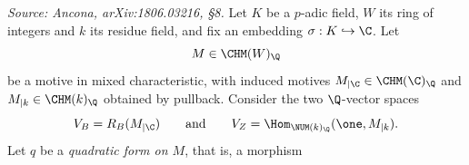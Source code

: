 \begin{theorem}
  \label{thm:mainthm}
  \textit{Source: Ancona, arXiv:1806.03216, §8.}
  Let \(K\) be a \(p\)-adic field, \(W\) its ring of integers and \(k\) its
  residue field, and fix an embedding \(\sigma : K \hookrightarrow \C\). Let
  \[M \in \CHM(W)_\Q\]
  be a motive in mixed characteristic, with induced motives
  \(M_{\vert\C} \in \CHM(\C)_\Q\) and \(M_{\vert{k}} \in \CHM(k)_\Q\) obtained by
  pullback. Consider the two \(\Q\)-vector spaces
  \[V_B = R_B(M_{\vert\C}) \qquad \text{and} \qquad
    V_Z = \Hom_{\NUM(k)_\Q}(\one, M_{\vert{k}}).\]
  Let \(q\) be a \emph{quadratic form on \(M\)}, that is, a morphism

\end{theorem}

